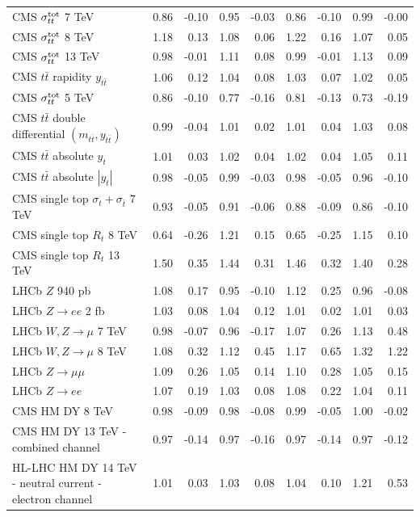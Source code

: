\documentclass[withindex,glossary]{cam-thesis}
\begin{document}
\begin{table}[H]
\begin{tabular}{lrrrrrrrr}
CMS $\sigma_{tt}^{\rm tot}$ 7 TeV & 0.86 & -0.10 & 0.95 & -0.03 & 0.86 & -0.10 & 0.99 & -0.00 \\
CMS $\sigma_{tt}^{\rm tot}$ 8 TeV & 1.18 & 0.13 & 1.08 & 0.06 & 1.22 & 0.16 & 1.07 & 0.05 \\
CMS $\sigma_{tt}^{\rm tot}$ 13 TeV & 0.98 & -0.01 & 1.11 & 0.08 & 0.99 & -0.01 & 1.13 & 0.09 \\
CMS $t\bar{t}$ rapidity $y_{t\bar{t}}$ & 1.06 & 0.12 & 1.04 & 0.08 & 1.03 & 0.07 & 1.02 & 0.05 \\
CMS $\sigma_{tt}^{\rm tot}$ 5 TeV & 0.86 & -0.10 & 0.77 & -0.16 & 0.81 & -0.13 & 0.73 & -0.19 \\
CMS $t\bar{t}$ double differential $(m_{t\bar{t}},y_{t\bar{t}})$ & 0.99 & -0.04 & 1.01 & 0.02 & 1.01 & 0.04 & 1.03 & 0.08 \\
CMS $t\bar{t}$ absolute $y_t$ & 1.01 & 0.03 & 1.02 & 0.04 & 1.02 & 0.04 & 1.05 & 0.11 \\
CMS $t\bar{t}$ absolute $|y_t|$ & 0.98 & -0.05 & 0.99 & -0.03 & 0.98 & -0.05 & 0.96 & -0.10 \\
CMS single top $\sigma_{t}+\sigma_{\bar{t}}$ 7 TeV & 0.93 & -0.05 & 0.91 & -0.06 & 0.88 & -0.09 & 0.86 & -0.10 \\
CMS single top $R_{t}$ 8 TeV & 0.64 & -0.26 & 1.21 & 0.15 & 0.65 & -0.25 & 1.15 & 0.10 \\
CMS single top $R_{t}$ 13 TeV & 1.50 & 0.35 & 1.44 & 0.31 & 1.46 & 0.32 & 1.40 & 0.28 \\
LHCb $Z$ 940 pb & 1.08 & 0.17 & 0.95 & -0.10 & 1.12 & 0.25 & 0.96 & -0.08 \\
LHCb $Z\to ee$ 2 fb & 1.03 & 0.08 & 1.04 & 0.12 & 1.01 & 0.02 & 1.01 & 0.03 \\
LHCb $W,Z \to \mu$ 7 TeV & 0.98 & -0.07 & 0.96 & -0.17 & 1.07 & 0.26 & 1.13 & 0.48 \\
LHCb $W,Z \to \mu$ 8 TeV & 1.08 & 0.32 & 1.12 & 0.45 & 1.17 & 0.65 & 1.32 & 1.22 \\
LHCb $Z\to \mu\mu$ & 1.09 & 0.26 & 1.05 & 0.14 & 1.10 & 0.28 & 1.05 & 0.15 \\
LHCb $Z\to ee$ & 1.07 & 0.19 & 1.03 & 0.08 & 1.08 & 0.22 & 1.04 & 0.11 \\
CMS HM DY 8 TeV & 0.98 & -0.09 & 0.98 & -0.08 & 0.99 & -0.05 & 1.00 & -0.02 \\
CMS HM DY 13 TeV - combined channel & 0.97 & -0.14 & 0.97 & -0.16 & 0.97 & -0.14 & 0.97 & -0.12 \\
HL-LHC HM DY 14 TeV - neutral current - electron channel & 1.01 & 0.03 & 1.03 & 0.08 & 1.04 & 0.10 & 1.21 & 0.53 \\

\end{tabular}
\end{table}
\end{document}
